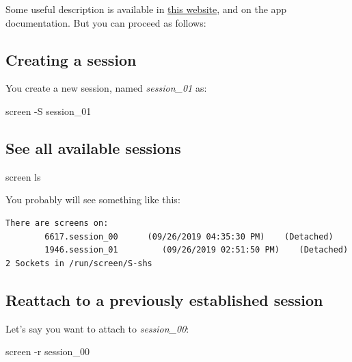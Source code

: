 \documentclass[
]{book}
\newenvironment{Shaded}{\begin{snugshade}}{\end{snugshade}}
\newcommand{\AttributeTok}[1]{\textcolor[rgb]{0.77,0.63,0.00}{#1}}
\newcommand{\ExtensionTok}[1]{#1}
\newcommand{\NormalTok}[1]{#1}
\begin{document}
Some useful description is available in \href{https://web.archive.org/web/20230606181644/https://www.networkworld.com/article/3441777/how-the-linux-screen-tool-can-save-your-tasks-and-your-sanity-if-ssh-is-interrupted.html}{this website}, and on the app documentation. But you can proceed as follows:

\hypertarget{creating-a-session}{%
\subsection{Creating a session}\label{creating-a-session}}

You create a new session, named \emph{session\_01} as:

\begin{Shaded}
\begin{Highlighting}[]
\ExtensionTok{screen} \AttributeTok{{-}S}\NormalTok{ session\_01}
\end{Highlighting}
\end{Shaded}

\hypertarget{see-all-available-sessions}{%
\subsection{See all available sessions}\label{see-all-available-sessions}}

\begin{Shaded}
\begin{Highlighting}[]
\ExtensionTok{screen}\NormalTok{ ls}
\end{Highlighting}
\end{Shaded}

You probably will see something like this:

\begin{verbatim}
There are screens on:
        6617.session_00      (09/26/2019 04:35:30 PM)    (Detached)
        1946.session_01         (09/26/2019 02:51:50 PM)    (Detached)
2 Sockets in /run/screen/S-shs
\end{verbatim}

\hypertarget{reattach-to-a-previously-established-session}{%
\subsection{Reattach to a previously established session}\label{reattach-to-a-previously-established-session}}

Let's say you want to attach to \emph{session\_00}:

\begin{Shaded}
\begin{Highlighting}[]
\ExtensionTok{screen} \AttributeTok{{-}r}\NormalTok{ session\_00}
\end{Highlighting}
\end{Shaded}
\end{document}
